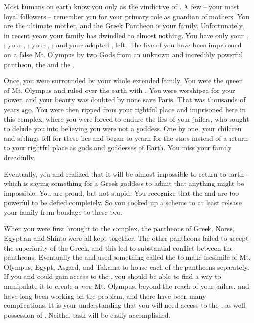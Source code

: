 \documentclass[char]{guardians}
\begin{document}
\name{\cHera{}}

Most humans on earth know you only as the vindictive \cHera{\spouse} of \cZeus{}. A few -- your most loyal followers -- remember you for your primary role as guardian of mothers. You are the ultimate mother, and the Greek Pantheon is your family. Unfortunately, in recent years your family has dwindled to almost nothing. You have only your \cZeus{\spouse}, \cZeus{}; your \cAthena{\offspring}, \cAthena{}; your \cHephaestus{\offspring}, \cHephaestus{}; and your adopted \cPandora{\offspring}, \cPandora{} left. The five of you have been imprisoned on a false Mt. Olympus by two Gods from an unknown and incredibly powerful pantheon, the \cWarden{} and the \cCaretaker{}.

Once, you were surrounded by your whole extended family. You were the queen of Mt. Olympus and ruled over the earth with \cZeus{}. You were worshiped for your power, and your beauty was doubted by none save Paris. That was thousands of years ago. You were then ripped from your rightful place and imprisoned here in this complex, where you were forced to endure the lies of your jailers, who sought to delude you into believing you were not a goddess. One by one, your children and siblings fell for these lies and began to yearn for the stars instead of a return to your rightful place as gods and goddesses of Earth.  You miss your family dreadfully.

Eventually, you and \cZeus{} realized that it will be almost impossible to return to earth -- which is saying something for a Greek goddess to admit that anything might be impossible. You are proud, but not stupid. You recognize that the \cWarden{} and \cCaretaker{} are too powerful to be defied completely. So you cooked up a scheme to at least release your family from bondage to these two.

When you were first brought to the complex, the pantheons of Greek, Norse, Egyptian and Shinto were all kept together. The other pantheons failed to accept the superiority of the Greek, and this led to substantial conflict between the pantheons. Eventually the \cCaretaker{} and \cWarden{} used something called the \stone{} to make facsimile of Mt. Olympus, Egypt, Asgard, and Takama to house each of the pantheons separately. If you and \cZeus{} could gain access to the \stone{}, you should be able to find a way to manipulate it to create a \emph{new} Mt. Olympus, beyond the reach of your jailers.  \cZeus{} and \cHephaestus{} have long been working on the problem, and there have been many complications. It is your understanding that you will need access to the \stone{}, as well possession of \iHammer{\MYname}. Neither task will be easily accomplished.
\end{document}
